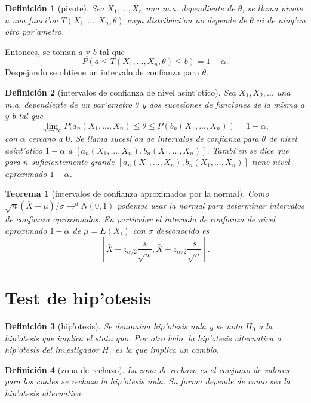\documentclass[a4paper,spanish]{article}
\newcommand{\limite}[2]{\lim_{ #1 \rightarrow #2}}
\newcommand{\tiended}[0]{\longrightarrow^d}
\newtheorem{teo}{Teorema}
\newtheorem{defi}{Definici\'on}
\begin{document}
\begin{defi}[pivote]
Sea $X_1,...,X_n$ una m.a. dependiente de $\theta$, se llama \emph{pivote} a
una funci'on $T(X_1,...,X_n,\theta)$ cuya distribuci'on no depende de $\theta$
ni de ning'un otro par'ametro. 
\end{defi}
Entonces, se toman $a$ y $b$ tal que
$$P(a \leq T(X_1,...,X_n,\theta) \leq b) = 1 - \alpha.$$
Despejando se obtiene un intervalo de confianza para $\theta$.

\begin{defi}[intervalos de confianza de nivel asint'otico]
Sea $X_1,X_2,...$ una m.a. dependiente de un par'ametro $\theta$ y dos
sucesiones de funciones de la misma a y b tal que
$$\limite{n}{\infty} P(a_n(X_1,...,X_n) \leq \theta \leq P(b_n(X_1,...,X_n))
	= 1-\alpha,$$
con $\alpha$ cercano a $0$. Se llama \emph{sucesi'on de intervalos de
confianza} para $\theta$ de \emph{nivel asint'otico} $1-\alpha$ a 
$[a_n(X_1,...,X_n),b_n(X_1,...,X_n)]$. Tambi'en se dice que para $n$
suficientemente grande $[a_n(X_1,...,X_n),b_n(X_1,...,X_n)]$ tiene nivel
aproximado $1-\alpha$.
\end{defi}

\begin{teo}[intervalos de confianza aproximados por la normal]
Como $\sqrt{n}(\bar{X}-\mu)/\sigma \tiended N(0,1)$ podemos usar la normal
para determinar intervalos de confianza aproximados. En particular el intervalo
de confianza de nivel aproximado $1-\alpha$ de $\mu = E(X_i)$ con $\sigma$
desconocido es
$$\left[\bar{X}-z_{\alpha/2}\frac{s}{\sqrt{n}},
	\bar{X}+z_{\alpha/2}\frac{s}{\sqrt{n}}\right].$$
\end{teo}

\section{Test de hip'otesis}

\begin{defi}[hip'otesis]
Se denomina \emph{hip'otesis nula} y se nota $H_0$ a la hip'otesis que implica
el statu quo. Por otro lado, la \emph{hip'otesis alternativa} o 
\emph{hip'otesis del investigador} $H_1$ es la que implica un cambio.
\end{defi}

\begin{defi}[zona de rechazo]
La \emph{zona de rechazo} es el conjunto de valores para los cuales
se rechaza la hip'otesis nula. Su forma depende de como sea la hip'otesis
alternativa.
\end{defi}
\end{document}
